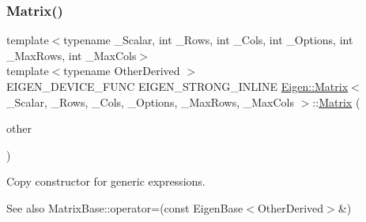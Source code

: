 \subsubsection{\texorpdfstring{Matrix()}{Matrix()}\hspace{0.1cm}{\footnotesize\ttfamily [2/3]}}
{\footnotesize\ttfamily template$<$typename \+\_\+\+Scalar, int \+\_\+\+Rows, int \+\_\+\+Cols, int \+\_\+\+Options, int \+\_\+\+Max\+Rows, int \+\_\+\+Max\+Cols$>$ \\
template$<$typename Other\+Derived $>$ \\
E\+I\+G\+E\+N\+\_\+\+D\+E\+V\+I\+C\+E\+\_\+\+F\+U\+NC E\+I\+G\+E\+N\+\_\+\+S\+T\+R\+O\+N\+G\+\_\+\+I\+N\+L\+I\+NE \mbox{\hyperlink{class_eigen_1_1_matrix}{Eigen\+::\+Matrix}}$<$ \+\_\+\+Scalar, \+\_\+\+Rows, \+\_\+\+Cols, \+\_\+\+Options, \+\_\+\+Max\+Rows, \+\_\+\+Max\+Cols $>$\+::\mbox{\hyperlink{class_eigen_1_1_matrix}{Matrix}} (\begin{DoxyParamCaption}\item[{const \mbox{\hyperlink{struct_eigen_1_1_eigen_base}{Eigen\+Base}}$<$ Other\+Derived $>$ \&}]{other }\end{DoxyParamCaption})\hspace{0.3cm}{\ttfamily [inline]}}



Copy constructor for generic expressions. 

\begin{DoxySeeAlso}{See also}
Matrix\+Base\+::operator=(const Eigen\+Base$<$\+Other\+Derived$>$\&) 
\end{DoxySeeAlso}
\mbox{\label{class_eigen_1_1_matrix_ae714ec2f92b13d808c336faf185e5893}} 
